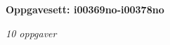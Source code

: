 \centerline{\bf Oppgavesett: i00369no-i00378no}
\vskip 10pt
\centerline{\it 10 oppgaver}\vskip 10pt
\vskip 10pt
